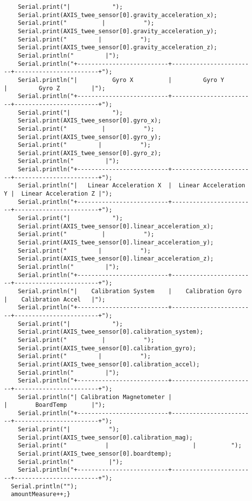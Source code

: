 \begin{lstlisting}
    Serial.print("|            ");
    Serial.print(AXIS_twee_sensor[0].gravity_acceleration_x);
    Serial.print("          |           ");
    Serial.print(AXIS_twee_sensor[0].gravity_acceleration_y);
    Serial.print("         |           ");
    Serial.print(AXIS_twee_sensor[0].gravity_acceleration_z);
    Serial.println("         |");
    Serial.println("+--------------------------+------------------------+------------------------+");
    Serial.println("|          Gyro X          |         Gyro Y         |         Gyro Z         |");
    Serial.println("+--------------------------+------------------------+------------------------+");
    Serial.print("|            ");
    Serial.print(AXIS_twee_sensor[0].gyro_x);
    Serial.print("          |           ");
    Serial.print(AXIS_twee_sensor[0].gyro_y);
    Serial.print("         |           ");
    Serial.print(AXIS_twee_sensor[0].gyro_z);
    Serial.println("         |");
    Serial.println("+--------------------------+------------------------+------------------------+");
    Serial.println("|   Linear Acceleration X  |  Linear Acceleration Y |  Linear Acceleration Z |");
    Serial.println("+--------------------------+------------------------+------------------------+");
    Serial.print("|            ");
    Serial.print(AXIS_twee_sensor[0].linear_acceleration_x);
    Serial.print("          |           ");
    Serial.print(AXIS_twee_sensor[0].linear_acceleration_y);
    Serial.print("         |           ");
    Serial.print(AXIS_twee_sensor[0].linear_acceleration_z);
    Serial.println("         |");
    Serial.println("+--------------------------+------------------------+------------------------+");
    Serial.println("|    Calibration System    |    Calibration Gyro    |    Calibration Accel   |");
    Serial.println("+--------------------------+------------------------+------------------------+");
    Serial.print("|            ");
    Serial.print(AXIS_twee_sensor[0].calibration_system);
    Serial.print("          |           ");
    Serial.print(AXIS_twee_sensor[0].calibration_gyro);
    Serial.print("         |           ");
    Serial.print(AXIS_twee_sensor[0].calibration_accel);
    Serial.println("         |");
    Serial.println("+--------------------------+------------------------+------------------------+");
    Serial.println("| Calibration Magnetometer |                        |        BoardTemp       |");
    Serial.println("+--------------------------+------------------------+------------------------+");
    Serial.print("|           ");
    Serial.print(AXIS_twee_sensor[0].calibration_mag);
    Serial.print("           |                        |          ");
    Serial.print(AXIS_twee_sensor[0].boardtemp);
    Serial.println("          |");
    Serial.println("+--------------------------+------------------------+------------------------+");
  Serial.println("");
  amountMeasure++;}


\end{lstlisting}
